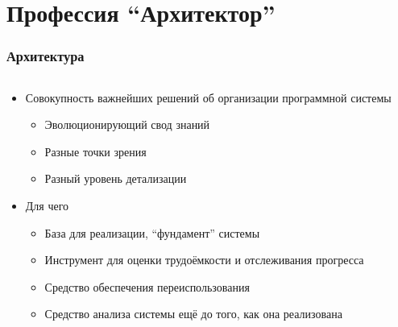 \documentclass{../../slides-style}
\begin{document}
    \begin{frame}[plain]
        \titlepage
    \end{frame}

    \section{Профессия \enquote{Архитектор}}

    \begin{frame}
        \frametitle{Архитектура}
        \begin{columns}
            \begin{column}{0.7\textwidth}
                \begin{itemize}
                    \item Совокупность важнейших решений об организации программной системы
                    \begin{itemize}
                        \item Эволюционирующий свод знаний
                        \item Разные точки зрения
                        \item Разный уровень детализации
                    \end{itemize}
                    \item Для чего
                    \begin{itemize}
                        \item База для реализации, \enquote{фундамент} системы
                        \item Инструмент для оценки трудоёмкости и отслеживания прогресса
                        \item Средство обеспечения переиспользования
                        \item Средство анализа системы ещё до того, как она реализована
                    \end{itemize}
                \end{itemize}
            \end{column}
            \begin{column}{0.3\textwidth}
                \begin{center}

\end{center}
\end{column}
\end{columns}
\end{frame}
\end{document}
